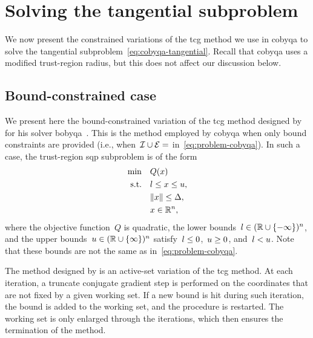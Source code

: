 \section{Solving the tangential subproblem}
\label{sec:cobyqa-tangential}

We now present the constrained variations of the \gls{tcg} method we use in \gls{cobyqa} to solve the tangential subproblem~\cref{eq:cobyqa-tangential}.
Recall that \gls{cobyqa} uses a modified trust-region radius, but this does not affect our discussion below.

\subsection{Bound-constrained case}

We present here the bound-constrained variation of the \gls{tcg} method designed by \citeauthor{Powell_2009} for his solver \gls{bobyqa}~\cite{Powell_2009}.
This is the method employed by \gls{cobyqa} when only bound constraints are provided (i.e., when~$\iub \cup \ieq = \empty$ in~\cref{eq:problem-cobyqa}).
In such a case, the trust-region \gls{sqp} subproblem is of the form
\begin{subequations}
    \label{eq:problem-bvtcg}
    \begin{align}
        \min        & \quad Q(\iter) \label{eq:problem-bvtcg-obj}\\
        \text{s.t.} & \quad \xl \le \iter \le \xu,\\
                    & \quad \norm{\iter} \le \rad,\\
                    & \quad \iter \in \R^n, \nonumber
    \end{align}
\end{subequations}
where the objective function~$Q$ is quadratic, the lower bounds~$l \in (\mathbb{R} \cup \{-\infty\})^n$, and the upper bounds~$u \in (\mathbb{R} \cup \{\infty\})^n$ satisfy~$l \le 0$,~$u \ge 0$, and~$l < u$.
Note that these bounds are not the same as in~\cref{eq:problem-cobyqa}.

The method designed by \citeauthor{Powell_2009} is an active-set variation of the \gls{tcg} method.
At each iteration, a truncate conjugate gradient step is performed on the coordinates that are not fixed by a given working set.
If a new bound is hit during such iteration, the bound is added to the working set, and the procedure is restarted.
The working set is only enlarged through the iterations, which then ensures the termination of the method.

